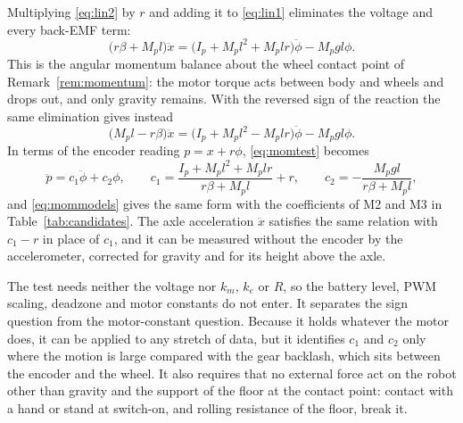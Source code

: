 Multiplying \eqref{eq:lin2} by $r$ and adding it to \eqref{eq:lin1}
eliminates the voltage and every back-EMF term:
\begin{equation}\label{eq:momtest}
\bigl(r\beta+M_pl\bigr)\ddot x
=\bigl(I_p+M_pl^2+M_plr\bigr)\ddot\phi-M_pgl\phi .
\end{equation}
This is the angular momentum balance about the wheel contact point of
Remark~\ref{rem:momentum}: the motor torque acts between body and wheels and
drops out, and only gravity remains. With the reversed sign of the reaction
the same elimination gives instead
\begin{equation}\label{eq:mommodels}
\bigl(M_pl-r\beta\bigr)\ddot x
=\bigl(I_p+M_pl^2-M_plr\bigr)\ddot\phi-M_pgl\phi .
\end{equation}
In terms of the encoder reading $p=x+r\phi$, \eqref{eq:momtest} becomes
\begin{equation}\label{eq:momenc}
\ddot p=c_1\ddot\phi+c_2\phi ,
\qquad
c_1=\frac{I_p+M_pl^2+M_plr}{r\beta+M_pl}+r ,
\qquad
c_2=-\frac{M_pgl}{r\beta+M_pl},
\end{equation}
and \eqref{eq:mommodels} gives the same form with the coefficients of M2 and M3
in Table~\ref{tab:candidates}. The axle acceleration $\ddot x$ satisfies the
same relation with $c_1-r$ in place of $c_1$, and it can be measured without
the encoder by the accelerometer, corrected for gravity and for its height
above the axle.

The test needs neither the voltage nor $k_m$, $k_e$ or $R$, so the battery
level, PWM scaling, deadzone and motor constants do not enter. It separates the
sign question from the motor-constant question. Because it holds whatever the
motor does, it can be applied to any stretch of data, but it identifies $c_1$
and $c_2$ only where the motion is large compared with the gear backlash, which
sits between the encoder and the wheel. It also requires that no external force
act on the robot other than gravity and the support of the floor at the contact
point: contact with a hand or stand at switch-on, and rolling resistance of the
floor, break it.

